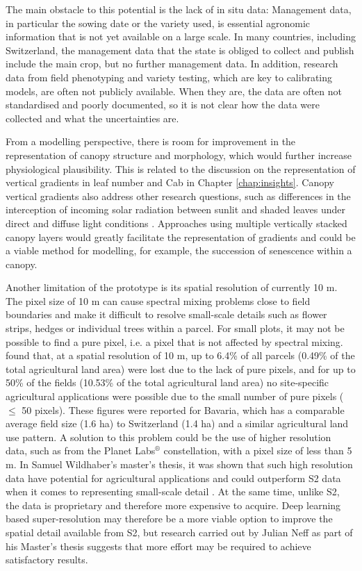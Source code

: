 The main obstacle to this potential is the lack of in situ data: Management data, in particular the sowing date or the variety used, is essential agronomic information that is not yet available on a large scale. In many countries, including Switzerland, the management data that the state is obliged to collect and publish include the main crop, but no further management data. In addition, research data from field phenotyping and variety testing, which are key to calibrating models, are often not publicly available. When they are, the data are often not standardised and poorly documented, so it is not clear how the data were collected and what the uncertainties are.

From a modelling perspective, there is room for improvement in the representation of canopy structure and morphology, which would further increase physiological plausibility. This is related to the discussion on the representation of vertical gradients in leaf number and \gls{Cab} in Chapter \ref{chap:insights}. Canopy vertical gradients also address other research questions, such as differences in the interception of incoming solar radiation between sunlit and shaded leaves under direct and diffuse light conditions \citep{he_development_2013}. Approaches using multiple vertically stacked canopy layers would greatly facilitate the representation of gradients and could be a viable method for modelling, for example, the succession of senescence within a canopy.

Another limitation of the prototype is its spatial resolution of currently 10 m. The pixel size of 10 m can cause spectral mixing problems close to field boundaries and make it difficult to resolve small-scale details such as flower strips, hedges or individual trees within a parcel. For small plots, it may not be possible to find a pure pixel, i.e. a pixel that is not affected by spectral mixing. \cite{meier_assessments_2020} found that, at a spatial resolution of 10 m, up to 6.4\% of all parcels (0.49\% of the total agricultural land area) were lost due to the lack of pure pixels, and for up to 50\% of the fields (10.53\% of the total agricultural land area) no site-specific agricultural applications were possible due to the small number of pure pixels ($\le$ 50 pixels). These figures were reported for Bavaria, which has a comparable average field size (1.6 ha) to Switzerland (1.4 ha) and a similar agricultural land use pattern. A solution to this problem could be the use of higher resolution data, such as from the Planet Labs$^{\circledR}$ constellation, with a pixel size of less than 5 m. In Samuel Wildhaber's master's thesis, it was shown that such high resolution data have potential for agricultural applications and could outperform \gls{S2} data when it comes to representing small-scale detail \citep{wildhaber_assessing_2023}. At the same time, unlike \gls{S2}, the data is proprietary and therefore more expensive to acquire. Deep learning based super-resolution may therefore be a more viable option to improve the spatial detail available from \gls{S2}, but research carried out by Julian Neff as part of his Master's thesis suggests that more effort may be required to achieve satisfactory results.

